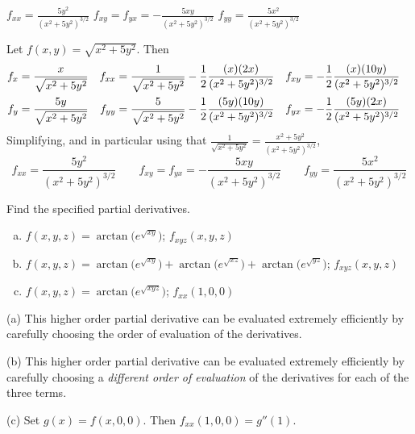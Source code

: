 
\begin{answer}
$f_{xx}=\frac{5y^2}{(x^2+5y^2)^{3/2}}$\quad
$f_{xy}=f_{yx}=-\frac{5xy}{(x^2+5y^2)^{3/2}}$\quad
$f_{yy}=\frac{5x^2}{(x^2+5y^2)^{3/2}}$
\end{answer}

\begin{solution}
Let $f(x,y)=\sqrt{x^2+5y^2}$. Then
\begin{align*}
f_x&=\frac{x}{\sqrt{x^2+5y^2}} &
f_{xx}&=\frac{1}{\sqrt{x^2+5y^2}}-\frac{1}{2}\frac{(x)(2x)}{(x^2+5y^2)^{3/2}} &
f_{xy}&=-\frac{1}{2}\frac{(x)(10y)}{(x^2+5y^2)^{3/2}}
\cr
f_y&=\frac{5y}{\sqrt{x^2+5y^2}} &
f_{yy}&=\frac{5}{\sqrt{x^2+5y^2}}-\frac{1}{2}\frac{(5y)(10y)}{(x^2+5y^2)^{3/2}}&
f_{yx}&=-\frac{1}{2}\frac{(5y)(2x)}{(x^2+5y^2)^{3/2}}
\end{align*}
Simplifying, and in particular using that $\frac{1}{\sqrt{x^2+5y^2}}
=\frac{x^2+5y^2}{(x^2+5y^2)^{3/2}}$,
\begin{equation*}
f_{xx}=\frac{5y^2}{(x^2+5y^2)^{3/2}}\qquad
f_{xy}=f_{yx}=-\frac{5xy}{(x^2+5y^2)^{3/2}}\qquad
f_{yy}=\frac{5x^2}{(x^2+5y^2)^{3/2}} 
\end{equation*}
\end{solution}


\begin{question}
Find the specified partial derivatives.
\begin{enumerate}[(a)]
\item
$f(x,y,z) = \arctan\big(e^{\sqrt{xy}}\big)$; $f_{xyz}(x,y,z)$
\item 
$f(x,y,z) = \arctan\big(e^{\sqrt{xy}}\big)
            +\arctan\big(e^{\sqrt{xz}}\big)
            +\arctan\big(e^{\sqrt{yz}}\big)$; $f_{xyz}(x,y,z)$
\item
$f(x,y,z) = \arctan\big(e^{\sqrt{xyz}}\big)$; $f_{xx}(1,0,0)$
\end{enumerate}
\end{question}

\begin{hint}
(a) This higher order partial derivative can be evaluated extremely efficiently
by carefully choosing the order of evaluation of the derivatives.

(b) This higher order partial derivative can be evaluated extremely efficiently
by carefully choosing a \emph{different order of evaluation} of the derivatives
for each of the three terms.

(c) Set $g(x) = f(x,0,0)$. Then $f_{xx}(1,0,0)=g''(1)$.
\end{hint}

